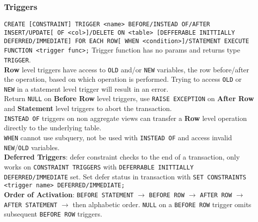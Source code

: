 \begin{multicols*}{3}
\subsubsection{Triggers}
\texttt{CREATE [CONSTRAINT] TRIGGER <name> BEFORE/INSTEAD OF/AFTER INSERT/UPDATE[ OF <col>]/DELETE ON <table> [DEFFERABLE INITTIALLY DEFERRED/IMMEDIATE] FOR EACH ROW[ WHEN <condition>]/STATEMENT EXECUTE FUNCTION <trigger func>;}
Trigger function has no params and returns type \texttt{TRIGGER}.\\
\textbf{Row} level triggers have access to \texttt{OLD} and/or \texttt{NEW} variables, the row before/after the operation, based on which operation is performed. Trying to access \texttt{OLD} or \texttt{NEW} in a statement level trigger will result in an error. \\
Return \texttt{NULL} on \textbf{Before Row} level triggers, use \texttt{RAISE EXCEPTION} on \textbf{After Row} and \textbf{Statement} level triggers to abort the transaction.\\
\texttt{INSTEAD OF} triggers on non aggregate views can transfer a \textbf{Row} level operation directly to the underlying table. \\
\texttt{WHEN} cannot use subquery, not be used with \texttt{INSTEAD OF} and access invalid \texttt{NEW}/\texttt{OLD} variables.\\
\textbf{Deferred Triggers}: defer constraint checks to the end of a transaction, only works on \texttt{CONSTRAINT TRIGGERS} with \texttt{DEFERRABLE INITTIALLY DEFERRED/IMMEDIATE} set. Set defer status in transaction with \texttt{SET CONSTRAINTS <trigger name> DEFERRED/IMMEDIATE;}\\
\textbf{Order of Activation}: \texttt{BEFORE STATEMENT} $\rightarrow$ \texttt{BEFORE ROW} $\rightarrow$ \texttt{AFTER ROW} $\rightarrow$ \texttt{AFTER STATEMENT} $\rightarrow$ then alphabetic order. \texttt{NULL} on a \texttt{BEFORE ROW} trigger omits subsequent \texttt{BEFORE ROW} triggers.\\


\end{multicols*}
